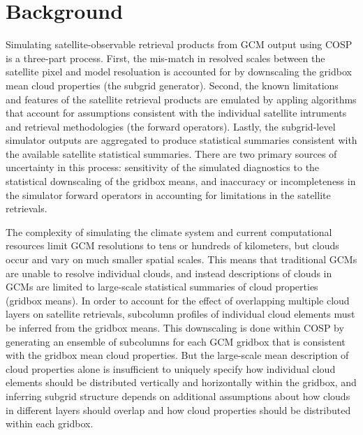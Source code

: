 \documentclass{article}
\begin{document}
\section{Background}
Simulating satellite-observable retrieval products from GCM output using COSP is a three-part process. First, the mis-match in resolved scales between the satellite pixel and model resoluation is accounted for by downscaling the gridbox mean cloud properties (the subgrid generator). Second, the known limitations and features of the satellite retrieval products are emulated by appling algorithms that account for assumptions consistent with the individual satellite intruments and retrieval methodologies (the forward operators). Lastly, the subgrid-level simulator outputs are aggregated to produce statistical summaries consistent with the available satellite statistical summaries. There are two primary sources of uncertainty in this process: sensitivity of the simulated diagnostics to the statistical downscaling of the gridbox means, and inaccuracy or incompleteness in the simulator forward operators in accounting for limitations in the satellite retrievals.

The complexity of simulating the climate system and current computational resources limit GCM resolutions to tens or hundreds of kilometers, but clouds occur and vary on much smaller spatial scales. This means that traditional GCMs are unable to resolve individual clouds, and instead descriptions of clouds in GCMs are limited to large-scale statistical summaries of cloud properties (gridbox means). In order to account for the effect of overlapping multiple cloud layers on satellite retrievals, subcolumn profiles of individual cloud elements must be inferred from the gridbox means. This downscaling is done within COSP by generating an ensemble of subcolumns for each GCM gridbox that is consistent with the gridbox mean cloud properties. But the large-scale mean description of cloud properties alone is insufficient to uniquely specify how individual cloud elements should be distributed vertically and horizontally within the gridbox, and inferring subgrid structure depends on additional assumptions about how clouds in different layers should overlap and how cloud properties should be distributed within each gridbox.
\end{document}
